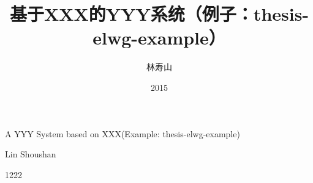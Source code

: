 \title{基于XXX的YYY系统（例子：thesis-elwg-example）}{A YYY System based on XXX(Example: thesis-elwg-example)}
\author{林寿山}{Lin Shoushan}
\date{2015}{12}{22}
